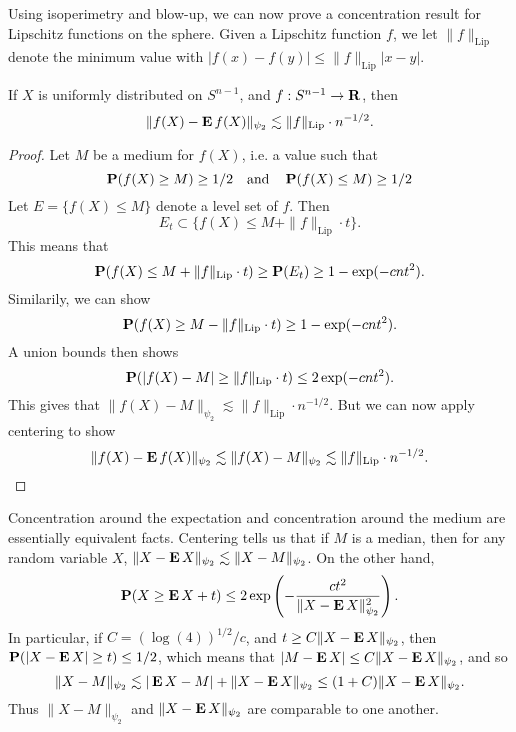 Using isoperimetry and blow-up, we can now prove a concentration result for Lipschitz functions on the sphere. Given a Lipschitz function $f$, we let $\| f \|_{\text{Lip}}$ denote the minimum value with $|f(x) - f(y)| \leq \| f \|_{\text{Lip}} |x - y|$.

\begin{theorem}
    If $X$ is uniformly distributed on $S^{n-1}$, and $f: S^{n-1} \to \operatorname{\mathbf{R}}$, then
    \[ \| f(X) - \operatorname{\mathbf{E}} f(X) \|_{\psi_2} \lesssim \| f \|_{\text{Lip}} \cdot n^{-1/2}. \]
\end{theorem}
\begin{proof}
    Let $M$ be a medium for $f(X)$, i.e. a value such that
    \[ \operatorname{\mathbf{P}}(f(X) \geq M) \geq 1/2\quad\text{and}\quad \operatorname{\mathbf{P}}(f(X) \leq M) \geq 1/2 \]
    Let $E = \{ f(X) \leq M \}$ denote a level set of $f$. Then
    \[ E_t \subset \{ f(X) \leq M + \| f \|_{\text{Lip}} \cdot t \}. \]
    This means that
    \[ \operatorname{\mathbf{P}}(f(X) \leq M + \| f \|_{\text{Lip}} \cdot t ) \geq \operatorname{\mathbf{P}}(E_t) \geq 1 - \exp(-cn t^2 ). \]
    Similarily, we can show
    \[ \operatorname{\mathbf{P}}(f(X) \geq M - \| f \|_{\text{Lip}} \cdot t) \geq 1 - \exp(-cn t^2). \]
    A union bounds then shows
    \[ \operatorname{\mathbf{P}}(|f(X) - M| \geq \| f \|_{\text{Lip}} \cdot t) \leq 2 \exp(-cn t^2). \]
    This gives that $\| f(X) - M \|_{\psi_2} \lesssim \| f \|_{\text{Lip}} \cdot n^{-1/2}$. But we can now apply centering to show
    \[ \| f(X) - \operatorname{\mathbf{E}} f(X) \|_{\psi_2} \lesssim \| f(X) - M \|_{\psi_2} \lesssim \| f \|_{\text{Lip}} \cdot n^{-1/2}. \qedhere \]
\end{proof}

\begin{remark}
    Concentration around the expectation and concentration around the medium are essentially equivalent facts. Centering tells us that if $M$ is a median, then for any random variable $X$, $\| X - \operatorname{\mathbf{E}} X \|_{\psi_2} \lesssim \| X - M \|_{\psi_2}$. On the other hand,
    \[ \operatorname{\mathbf{P}}(X \geq \operatorname{\mathbf{E}} X + t) \leq 2 \exp \left( -\frac{c t^2}{\| X - \operatorname{\mathbf{E}} X \|_{\psi_2}^2} \right). \]
    In particular, if $C = (\log(4))^{1/2}/c$, and $t \geq C \| X - \operatorname{\mathbf{E}} X \|_{\psi_2}$, then $\operatorname{\mathbf{P}}(|X - \operatorname{\mathbf{E}} X| \geq t) \leq 1/2$, which means that $|M - \operatorname{\mathbf{E}} X| \leq C \| X - \operatorname{\mathbf{E}} X \|_{\psi_2}$, and so
    \[ \| X - M \|_{\psi_2} \lesssim |\operatorname{\mathbf{E}} X - M| + \| X - \operatorname{\mathbf{E}} X \|_{\psi_2} \leq (1 + C) \| X - \operatorname{\mathbf{E}} X \|_{\psi_2}. \]
    Thus $\| X - M \|_{\psi_2}$ and $\| X - \operatorname{\mathbf{E}} X \|_{\psi_2}$ are comparable to one another.
\end{remark}

